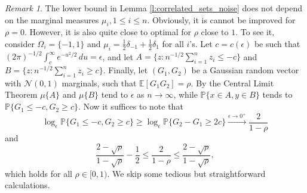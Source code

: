\documentclass[11pt]{amsart}
\newcommand{\E}{\mathbb{E}}
\newcommand{\PP}{\mathbb{P}}
\newcommand{\eps}{\epsilon}
\newcommand{\1}{\mathbf{1}}
\def\E{{\mathbb E}}
\theoremstyle{definition}
\theoremstyle{plain}
\theoremstyle{remark}
\newtheorem{remark}[example]{Remark}
\numberwithin{equation}{section}
\begin{document}
\begin{remark} \label{r:corr_optimality}
The lower bound in Lemma \ref{l:correlated_sets_noise} does not depend on the marginal measures $\mu_i, 1\le i \le n$. Obviously, it is
cannot be improved for $\rho=0$. However, it is also quite close to optimal for $\rho$ close to $1$. To see it, consider $\Omega_{i}=\{ -1,1\}$ and
$\mu_{i}=\frac{1}{2}\delta_{-1}+\frac{1}{2}\delta_{1}$ for all $i$'s. Let $c=c(\eps)$ be such that
$(2\pi)^{-1/2}\int_{c}^{\infty} e^{-u^{2}/2}\,du=\eps$, and let $A=\{ z: n^{-1/2}\sum_{i=1}^{n} z_{i} \leq -c \}$
and $B=\{ z: n^{-1/2}\sum_{i=1}^{n} z_{i} \geq c \}$. Finally, let $(G_{1}, G_{2})$ be a Gaussian random vector
with ${\mathcal{N}}(0,1)$ marginals, such that $\E [G_{1}G_{2}]=\rho$.
By the Central Limit Theorem $\mu\{A\}$ and $\mu\{B\}$ tend to $\eps$ as $n \rightarrow \infty$, while
$\PP\{ x \in A, y \in B\}$ tends to $\PP\{G_{1} \leq -c, G_{2} \geq c\}$.
Now it suffices to note that
\[
\log_{\eps}\PP\{G_{1} \leq -c, G_{2} \geq c\} \geq \log_{\eps}\PP\{ G_{2}-G_{1} \geq 2c \}
\stackrel{\eps \to 0^{+}}{\longrightarrow} \frac{2}{1-\rho}
\]
and
\[
\frac{2-\sqrt{\rho}}{1-\sqrt{\rho}}-\frac{1}{2} \leq
\frac{2}{1-\rho}
\leq \frac{2-\sqrt{\rho}}{1-\sqrt{\rho}},
\]
which holds for all $\rho \in [0,1)$. We skip some tedious but straightforward calculations.
\end{remark}
\end{document}
